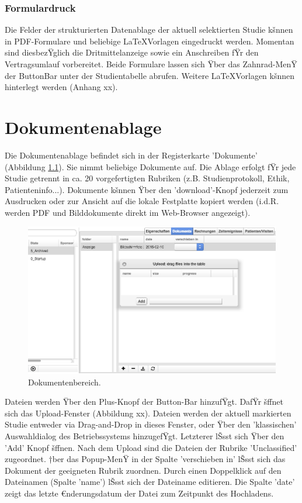 \documentclass[11pt,oneside]{scrbook}
\begin{document}
\subsection{Formulardruck}
Die Felder der strukturierten Datenablage der aktuell selektierten Studie kšnnen in PDF-Formulare und beliebige \LaTeX Vorlagen eingedruckt werden. Momentan sind diesbezŸglich die Dritmittelanzeige sowie ein Anschreiben fŸr den Vertragsumlauf vorbereitet. Beide Formulare lassen sich Ÿber das Zahnrad-MenŸ der ButtonBar unter der Studientabelle abrufen. Weitere  \LaTeX Vorlagen kšnnen hinterlegt werden (Anhang xx). %


\chapter{Dokumentenablage}
Die Dokumentenablage befindet sich in der Registerkarte 'Dokumente' (Abbildung \ref{fig:docs}). Sie nimmt  beliebige Dokumente  auf. Die Ablage erfolgt fŸr jede Studie getrennt in ca. 20 vorgefertigten Rubriken (z.B. Studienprotokoll, Ethik, Patienteninfo...).  Dokumente kšnnen Ÿber den 'down\-load'-Knopf jederzeit zum Ausdrucken oder zur Ansicht auf die lokale Festplatte kopiert werden (i.d.R. werden PDF und Bilddokumente direkt im Web-Browser angezeigt).

\begin{figure}[htbp]
\begin{center}
\includegraphics[scale=0.33]{figs/docs.png}
\caption{Dokumentenbereich.}
\label{fig:docs}
\end{center}
\end{figure}


Dateien werden Ÿber den Plus-Knopf der Button-Bar hinzufŸgt. DafŸr šffnet sich das Upload-Fenster (Abbildung xx). Dateien werden der aktuell markierten Studie entweder via Drag-and-Drop in dieses Fenster, oder Ÿber den  'klassischen' Auswahldialog des Betriebssystems hinzugefŸgt. Letzterer lŠsst sich Ÿber den 'Add' Knopf šffnen. Nach dem Upload sind die Dateien  der Rubrike 'Unclassified' zugeordnet. †ber das Popup-MenŸ in der Spalte 'verschieben in' lŠsst sich das Dokument der geeigneten Rubrik zuordnen. Durch einen Doppelklick auf den Dateinamen (Spalte 'name') lŠsst sich der Dateiname editieren. Die Spalte 'date' zeigt das letzte €nderungsdatum der Datei zum Zeitpunkt des Hochladens.
\end{document}
